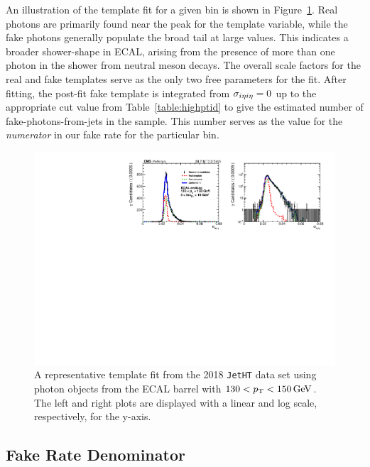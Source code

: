 An illustration of the template fit for a given \pt bin is shown in Figure~\ref{fig:templatefit}. Real photons are primarily found near the peak for the \sieie template variable, while the fake photons generally populate the broad tail at large \sieie values. This indicates a broader shower-shape in ECAL, arising from the presence of more than one photon in the shower from neutral meson decays. The overall scale factors for the real and fake templates serve as the only two free parameters for the fit. After fitting, the post-fit fake template is integrated from $\sigma_{i\eta i\eta}=0$ up to the appropriate cut value from Table~\ref{table:highptid} to give the estimated number of fake-photons-from-jets in the sample. This number serves as the value for the \emph{numerator} in our fake rate for the particular \pt bin. 

\begin{figure}[!htbp]
\centering
\includegraphics[scale=0.85]{fig/fakeRatePlot_jetht_2018_EE_pT130To150_chIso5To10.pdf}
\caption{A representative template fit from the 2018 \texttt{JetHT} data set using photon objects from the ECAL barrel with $130<p_{\mathrm{T}}<150\,\text{Ge\hspace{-.08em}V}$. The left and right plots are displayed with a linear and log scale, respectively, for the y-axis.}
\label{fig:templatefit}
\end{figure}

\subsection{Fake Rate Denominator}


